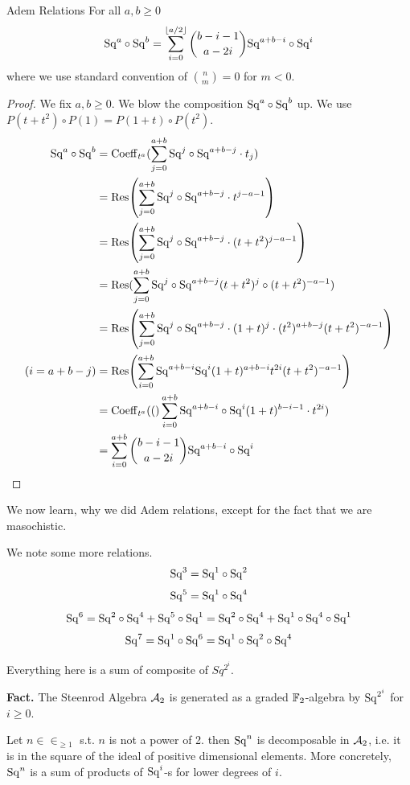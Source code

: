 \documentclass[language=english]{TemplateLecture}
\begin{document}
\begin{thm}{Adem Relations}{}
    For all \(a,b \geq 0\)
    \[\mathrm{Sq}^a \circ \mathrm{Sq}^b = \sum_{i = 0}^{\lfloor a/2 \rfloor} \binom{b-i-1}{a-2i} \mathrm{Sq}^{a+b-i} \circ \mathrm{Sq}^i\]
    where we use standard convention of \(\binom{n}{m} = 0\) for \(m< 0\).
\end{thm}

\begin{proof}
    We fix \(a,b \geq 0\). We blow the composition \(\mathrm{Sq}^a\circ \mathrm{Sq}^b\) up. We use \(P(t+t^2) \circ P(1) = P(1+t)\circ P(t^2)\).
    \[\begin{split}
        \Sq^a\circ \Sq^b &= \mathrm{Coeff}_{t^a}(\sum_{j= 0}^{a+b}\Sq^j \circ \Sq^{a+b-j} \cdot t_j) \\
        &= \Res\klam*{\sum_{j= 0}^{a+b}\Sq^j\circ \Sq^{a+b-j} \cdot t^{j-a-1}} \\
        &= \Res\klam*{\sum_{j = 0}^{a+b} \Sq^j \circ \Sq^{a+b-j} \cdot (t+t^2)^{j-a-1}} \\
        &= \Res(\sum_{j = 0}^{a+b} \Sq^j\circ \Sq^{a+b-j} (t+t^2)^j \circ (t+t^2)^{-a-1}) \\
        &= \Res\klam*{\sum_{j= 0}^{a+b} \Sq^j \circ \Sq^{a+b-j}\cdot (1+t)^j \cdot (t^2)^{a+b-j} (t+t^2)^{-a-1}} \\
        (i = a+b-j)&= \Res\klam*{\sum_{i = 0}^{a+b}\Sq^{a+b-i}\Sq^i (1+t)^{a+b-i}t^{2i}(t+t^2)^{-a-1}} \\
        &= \mathrm{Coeff}_{t^a}\klam*(\sum_{i = 0}^{a+b} \Sq^{a+b-i}\circ \Sq^{i}(1+t)^{b-i-1}\cdot t^{2i}) \\
        &= \sum_{i = 0}^{a+b} \binom{b-i-1}{a-2i} \Sq^{a+b-i}\circ \Sq^i \\
    \end{split}\]
\end{proof}

We now learn, why we did Adem relations, except for the fact that we are masochistic.

We note some more relations.
\[\mathrm{Sq}^3 = \mathrm{Sq}^1 \circ \mathrm{Sq}^2\]
\[\mathrm{Sq}^5 = \mathrm{Sq}^1 \circ \mathrm{Sq}^4\]
\[\mathrm{Sq}^6 = \mathrm{Sq}^2 \circ \mathrm{Sq}^4 + \mathrm{Sq}^5 \circ \mathrm{Sq}^1 = \mathrm{Sq}^2 \circ \mathrm{Sq}^4 + \mathrm{Sq}^1 \circ \mathrm{Sq}^4 \circ \mathrm{Sq}^1\]
\[\mathrm{Sq}^7 = \mathrm{Sq}^1 \circ \mathrm{Sq}^6 = \mathrm{Sq}^1 \circ \mathrm{Sq}^2 \circ \mathrm{Sq}^4\]

Everything here is a sum of composite of \(Sq^{2^i}\).

\textbf{Fact.} The Steenrod Algebra \(\mathcal{A}_2\) is generated as a graded \(\mathbb{F}_2\)-algebra by \(\mathrm{Sq}^{2^i}\) for \(i\geq 0\).

\begin{corollary}
    Let \(n\in \in_{\geq 1}\) s.t. \(n\) is not a power of 2. then \(\mathrm{Sq}^n\) is decomposable in \(\mathcal{A}_2\), i.e. it is in the square of the ideal of positive dimensional elements. More concretely, \(\mathrm{Sq}^n\) is a sum of products of \(\mathrm{Sq}^i\)-s for lower degrees of \(i\).
\end{corollary}
\end{document}
